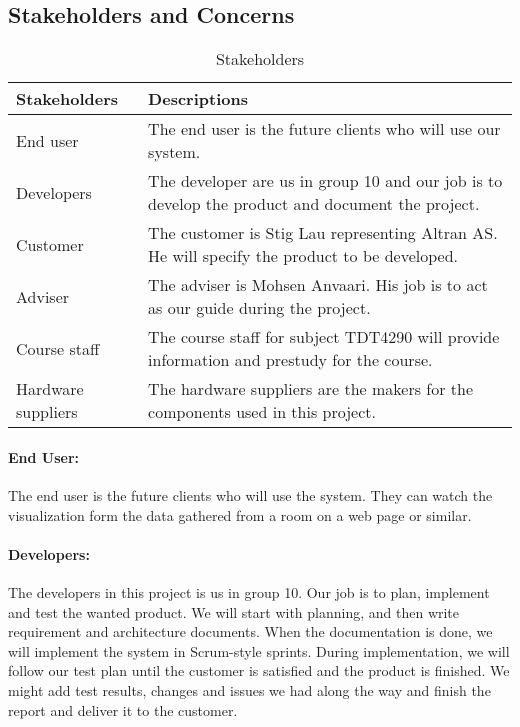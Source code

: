 \documentclass[../document.tex]{subfiles}
\begin{document}
\subsection{Stakeholders and Concerns}
\begin{table}[H]
	\caption{Stakeholders}
	\begin{tabularx}{\textwidth}{|X|X|}
		\hline
		\textbf{Stakeholders}	& \textbf{Descriptions} \\ \hline
		End user				& The end user is the future clients who will use our system.  \\ \hline
		Developers				& The developer are us in group 10 and our job is to develop the product and document the project.  \\ \hline
		Customer				& The customer is Stig Lau representing Altran AS. He will specify the product to be developed.  \\ \hline
		Adviser					& The adviser is Mohsen Anvaari. His job is to act as our guide during the project.  \\ \hline
		Course staff			& The course staff for subject TDT4290 will provide information and prestudy for the course.  \\ \hline
		Hardware suppliers		& The hardware suppliers are the makers for the components used in this project.  \\ \hline
	\end{tabularx}
\end{table}

\paragraph{End User:} The end user is the future clients who will use the system. They can watch the visualization form the data gathered from a room on a web page or similar. 

\paragraph{Developers:} The developers in this project is us in group 10. Our job is to plan, implement and test the wanted product. We will start with planning, and then write requirement and architecture documents. When the documentation is done, we will implement the system in Scrum-style sprints. During implementation, we will follow our test plan until the customer is satisfied and the product is finished. We might add test results, changes and issues we had along the way and finish the report and deliver it to the customer.
\end{document}
